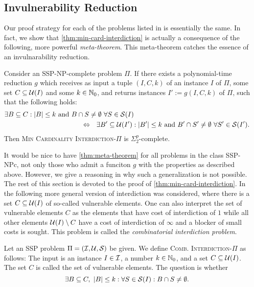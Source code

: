 \subsection{Invulnerability Reduction}

Our proof strategy for each of the problems listed in  is essentially the same.
In fact, we show that \cref{thm:min-card-interdiction} is actually a consequence of the following, more powerful \emph{meta-theorem}.
This meta-theorem catches the essence of an invulnarability reduction.

\begin{theorem}
\label{thm:meta-theorem}
    Consider an SSP-NP-complete problem $\Pi$.
    If there exists a polynomial-time reduction $g$ which receives as input a tuple $(I, C, k)$ of an instance $I$ of $\Pi$, some set $C \subseteq \mathcal{U}(I)$ and some $k \in \mathbb{N}_0$, and returns instances $I' := g(I, C, k)$ of $\Pi$, such that the following holds: 
     \begin{align*}
         \exists B \subseteq C : |B| \leq k \text{ and } B \cap S \neq \emptyset \ \forall S \in \mathcal{S}(I) \qquad\qquad\qquad\qquad\qquad\qquad\qquad\qquad\quad\\
         \Leftrightarrow \ \ \exists B' \subseteq \mathcal{U}(I') : |B'| \leq k \text{ and } B' \cap S' \neq \emptyset \ \forall S' \in \mathcal{S}(I').
     \end{align*}
     Then \textsc{Min Cardinality Interdiction-$\Pi$} is $\Sigma^p_2$-complete. 
\end{theorem}

It would be nice to have \cref{thm:meta-theorem} for all problems in the class SSP-NPc, not only those who admit a funciton $g$ with the properties as described above. However, we give a reasoning in  why such a generalization is not possible.
The rest of this section is devoted to the proof of \cref{thm:min-card-interdiction}.
In \cite{gruene2024completeness} the following more general version of interdiction was considered, where there is a set $C \subseteq \mathcal{U}(I)$ of so-called vulnerable elements.
One can also interpret the set of vulnerable elements $C$ as the elements that have cost of interdiction of $1$ while all other elements $\mathcal{U}(I) \setminus C$ have a cost of interdiction of $\infty$ and a blocker of small costs is sought.
This problem is called the \emph{combinatorial interdiction problem}.

\begin{definition}
    Let an SSP problem $\Pi = (\mathcal{I}, \mathcal{U}, \mathcal{S})$ be given.
    We define \textsc{Comb. Interdiction-$\Pi$} as follows:
    The input is an instance $I \in \mathcal{I}$, a number $k \in \mathbb{N}_0$, and a set $C \subseteq \mathcal{U}(I)$. The set $C$ is called the set of vulnerable elements.
    The question is whether
    \[
        \exists B \subseteq C, \ |B| \leq k : \forall S \in \mathcal{S}(I) : B \cap S \neq \emptyset.
    \]
\end{definition}

